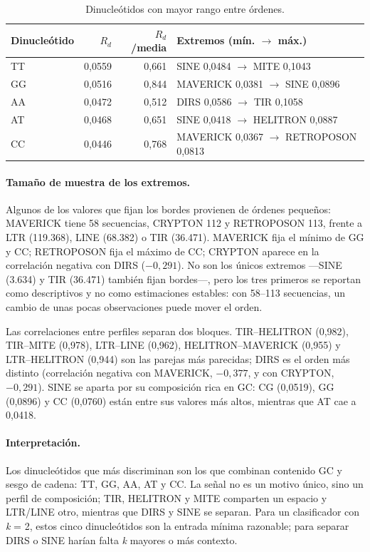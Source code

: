 \documentclass[journal]{IEEEtran}
\begin{document}
\begin{table}[!t]
\caption{Dinucleótidos con mayor rango entre órdenes.}
\label{tab:dinucleotidos}
\centering
\scriptsize
\setlength{\tabcolsep}{3pt}
\begin{tabular}{@{}lrrl@{}}
\toprule
Dinucleótido & $R_d$ & $R_d$/media & Extremos (mín. $\rightarrow$ máx.) \\
\midrule
TT & 0,0559 & 0,661 & SINE 0,0484 $\rightarrow$ MITE 0,1043 \\
GG & 0,0516 & 0,844 & MAVERICK 0,0381 $\rightarrow$ SINE 0,0896 \\
AA & 0,0472 & 0,512 & DIRS 0,0586 $\rightarrow$ TIR 0,1058 \\
AT & 0,0468 & 0,651 & SINE 0,0418 $\rightarrow$ HELITRON 0,0887 \\
CC & 0,0446 & 0,768 & MAVERICK 0,0367 $\rightarrow$ RETROPOSON 0,0813 \\
\bottomrule
\end{tabular}
\end{table}

\paragraph*{Tamaño de muestra de los extremos.}
Algunos de los valores que fijan los bordes provienen de órdenes pequeños: MAVERICK tiene 58
secuencias, CRYPTON 112 y RETROPOSON 113, frente a LTR (119.368), LINE (68.382) o TIR
(36.471). MAVERICK fija el mínimo de GG y CC; RETROPOSON fija el máximo de CC; CRYPTON
aparece en la correlación negativa con DIRS ($-0,291$). No son los únicos extremos ---SINE
(3.634) y TIR (36.471) también fijan bordes---, pero los tres primeros se reportan como
descriptivos y no como estimaciones estables: con 58--113 secuencias, un cambio de unas
pocas observaciones puede mover el orden.

Las correlaciones entre perfiles separan dos bloques. TIR--HELITRON (0,982), TIR--MITE
(0,978), LTR--LINE (0,962), HELITRON--MAVERICK (0,955) y LTR--HELITRON (0,944) son las
parejas más parecidas; DIRS es el orden más distinto (correlación negativa con MAVERICK,
$-0,377$, y con CRYPTON, $-0,291$). SINE se aparta por su composición rica en GC: CG
(0,0519), GG (0,0896) y CC (0,0760) están entre sus valores más altos, mientras que AT cae
a 0,0418.

\paragraph*{Interpretación.}
Los dinucleótidos que más discriminan son los que combinan contenido GC y sesgo de cadena:
TT, GG, AA, AT y CC. La señal no es un motivo único, sino un perfil de composición; TIR,
HELITRON y MITE comparten un espacio y LTR/LINE otro, mientras que DIRS y SINE se separan.
Para un clasificador con \textit{k} = 2, estos cinco dinucleótidos son la entrada mínima
razonable; para separar DIRS o SINE harían falta \textit{k} mayores o más contexto.
\end{document}
